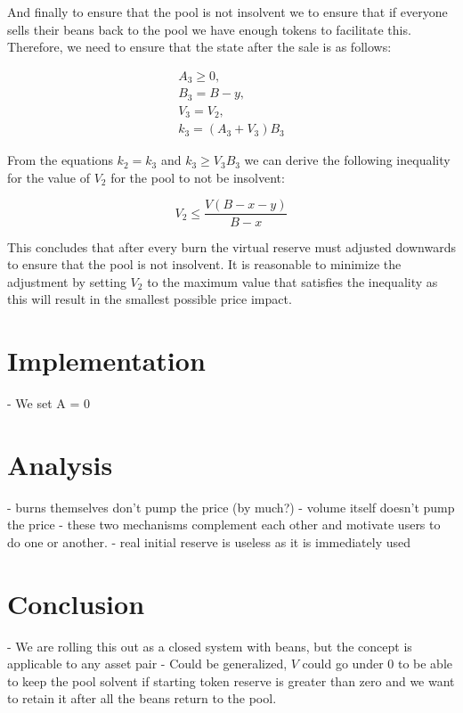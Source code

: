 \documentclass[11pt,a4paper]{article}
\theoremstyle{definition}
\begin{document}
And finally to ensure that the pool is not insolvent we to ensure that if everyone sells their beans back to the pool we have enough tokens to facilitate this. Therefore, we need to ensure that the state after the sale is as follows:

\begin{align*}
    A_3 \geq 0, \\
    B_3 = B - y, \\
    V_3 = V_2, \\
    k_3 = (A_3+V_3)B_3
\end{align*}

From the equations $k_2 = k_3$ and $k_3 \geq V_3B_3$ we can derive the following inequality for the value of $V_2$ for the pool to not be insolvent:

\begin{equation}
    V_2 \leq \frac{V(B-x-y)}{B-x}
\end{equation}

This concludes that after every burn the virtual reserve must adjusted downwards to ensure that the pool is not insolvent. It is reasonable to minimize the adjustment by setting $V_2$ to the maximum value that satisfies the inequality as this will result in the smallest possible price impact.


\section{Implementation}
\label{sec:implementation}

- We set A = 0

\section{Analysis}
\label{sec:analysis}

- burns themselves don't pump the price (by much?)
- volume itself doesn't pump the price
- these two mechanisms complement each other and motivate users to do one or another.
- real initial reserve is useless as it is immediately used 


\section{Conclusion}
\label{sec:conclusion}

- We are rolling this out as a closed system with beans, but the concept is applicable to any asset pair
- Could be generalized, $V$ could go under 0 to be able to keep the pool solvent if starting token reserve is greater than zero and we want to retain it after all the beans return to the pool.
\end{document}
